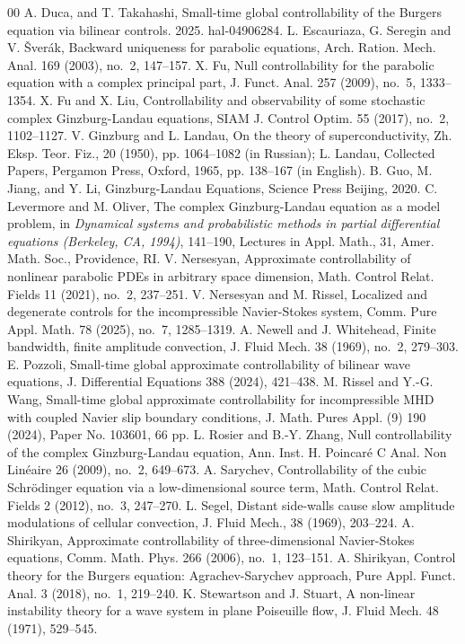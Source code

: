 \documentclass[review]{elsarticle}
\theoremstyle{dotless}
\numberwithin{equation}{section}
\begin{document}
\begin{thebibliography}{00}
A. Duca, and T. Takahashi, Small-time global controllability of the Burgers equation via bilinear controls. 2025. hal-04906284.
L. Escauriaza, G.  Seregin and V. \v Sver\'ak, Backward uniqueness for parabolic equations, Arch. Ration. Mech. Anal. 169 (2003), no.~2, 147--157.
X. Fu, Null controllability for the parabolic equation with a complex principal part, J. Funct. Anal. 257 (2009), no.~5, 1333--1354.
X. Fu and X. Liu, Controllability and observability of some stochastic complex Ginzburg-Landau equations, SIAM J. Control Optim. 55 (2017), no.~2, 1102--1127.
V. Ginzburg and L. Landau, On the theory of superconductivity, Zh. Eksp. Teor. Fiz., 20 (1950), pp. 1064–1082 (in Russian); L. Landau, Collected Papers, Pergamon Press, Oxford, 1965, pp. 138–167 (in English). 
B. Guo, M. Jiang, and Y. Li, Ginzburg-Landau Equations, Science Press Beijing, 2020.
C. Levermore and M. Oliver, The complex Ginzburg-Landau equation as a model problem, in {\it Dynamical systems and probabilistic methods in partial differential equations (Berkeley, CA, 1994)}, 141--190, Lectures in Appl. Math., 31, Amer. Math. Soc., Providence, RI. 
V. Nersesyan, Approximate controllability of nonlinear parabolic PDEs in arbitrary space dimension, Math. Control Relat. Fields 11 (2021), no.~2, 237--251.
V. Nersesyan and M. Rissel, Localized and degenerate controls for the incompressible Navier-Stokes system, Comm. Pure Appl. Math. 78 (2025), no.~7, 1285--1319.
A. Newell and J. Whitehead, Finite bandwidth, finite amplitude convection, J. Fluid Mech. 38 (1969), no.~2, 279--303.
E. Pozzoli, Small-time global approximate controllability of bilinear wave equations, J. Differential Equations 388 (2024), 421--438.
M. Rissel and Y.-G. Wang, Small-time global approximate controllability for incompressible MHD with coupled Navier slip boundary conditions, J. Math. Pures Appl. (9) 190 (2024), Paper No. 103601, 66 pp.
L. Rosier and B.-Y. Zhang, Null controllability of the complex Ginzburg-Landau equation, Ann. Inst. H. Poincar\'e{} C Anal. Non Lin\'eaire 26 (2009), no.~2, 649--673.
A. Sarychev, Controllability of the cubic Schr\"odinger equation via a low-dimensional source term, Math. Control Relat. Fields 2 (2012), no.~3, 247--270.
L. Segel, Distant side-walls cause slow amplitude modulations of cellular convection, J. Fluid Mech., 38 (1969),  203--224. 
A. Shirikyan, Approximate controllability of three-dimensional Navier-Stokes equations, Comm. Math. Phys. 266 (2006), no.~1, 123--151.
A. Shirikyan, Control theory for the Burgers equation: Agrachev-Sarychev approach, Pure Appl. Funct. Anal. 3 (2018), no.~1, 219--240.
K. Stewartson and J. Stuart, A non-linear instability theory for a wave system in plane Poiseuille flow, J. Fluid Mech. 48 (1971), 529--545.
\end{thebibliography}
\end{document}
